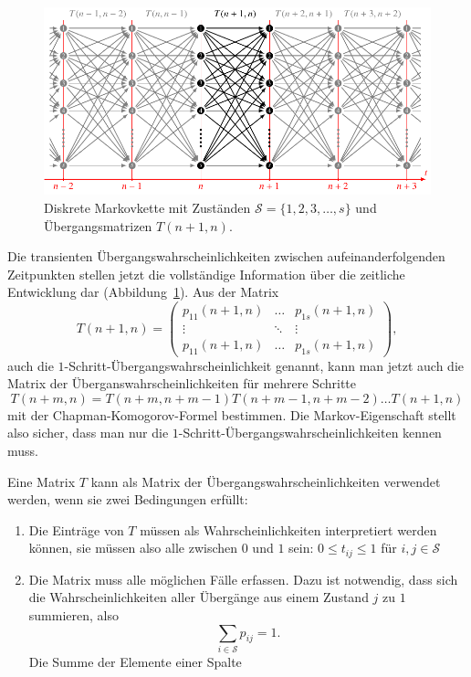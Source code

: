 \begin{figure}
\centering
\includegraphics{chapters/80-wahrscheinlichkeit/images/markov.pdf}
\caption{Diskrete Markovkette mit Zuständen $\mathcal{S}=\{1,2,3,\dots,s\}$
und Übergangsmatrizen $T(n+1,n)$.
\label{buch:wahrscheinlichkeit:fig:diskretemarkovkette}}
\end{figure}

Die transienten Übergangswahrscheinlichkeiten zwischen aufeinanderfolgenden
Zeitpunkten stellen jetzt die vollständige Information über die
zeitliche Entwicklung dar
(Abbildung~\ref{buch:wahrscheinlichkeit:fig:diskretemarkovkette}).
Aus der Matrix
\[
T(n+1,n)
=
\begin{pmatrix}
p_{11}(n+1,n) & \dots  & p_{1s}(n+1,n)\\
\vdots        & \ddots & \vdots       \\
p_{11}(n+1,n) & \dots  & p_{1s}(n+1,n)
\end{pmatrix},
\]
auch die $1$-Schritt-Übergangswahrscheinlichkeit genannt, kann man jetzt
auch die Matrix der Überganswahrscheinlichkeiten für mehrere Schritte
%
\[
T(n+m,n)
=
T(n+m,n+m-1)
T(n+m-1,n+m-2)
\dots
T(n+1,n)
\]
mit der Chapman-Komogorov-Formel bestimmen.
Die Markov-Eigenschaft stellt also sicher, dass man nur die 
$1$-Schritt-Übergangswahrscheinlichkeiten kennen muss.

Eine Matrix $T$ kann als Matrix der Übergangswahrscheinlichkeiten
verwendet werden, wenn sie zwei Bedingungen erfüllt:
\begin{enumerate}
\item Die Einträge von $T$ müssen als Wahrscheinlichkeiten interpretiert
werden können, sie müssen also alle zwischen $0$ und $1$ sein:
$0\le t_{i\!j}\le 1$ für $i,j\in\mathcal{S}$
\item Die Matrix muss alle möglichen Fälle erfassen.
Dazu ist notwendig, dass sich die Wahrscheinlichkeiten aller Übergänge
aus einem Zustand $j$ zu $1$ summieren, also
\[
\sum_{i\in\mathcal{S}} p_{i\!j} = 1.
\]
Die Summe der Elemente einer Spalte 
\end{enumerate}

